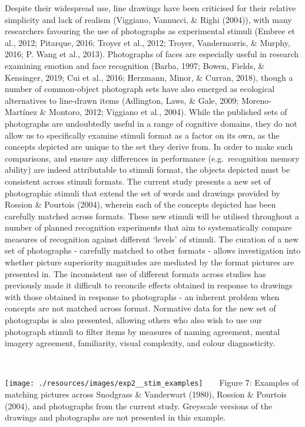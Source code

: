 \documentclass[
  11pt,
]{article}
\begin{document}
Despite their widespread use, line drawings have been criticised for
their relative simplicity and lack of realism (Viggiano, Vannucci, \&
Righi (2004)), with many researchers favouring the use of photographs as
experimental stimuli (Embree et al., 2012; Pitarque, 2016; Troyer et
al., 2012; Troyer, Vandermorris, \& Murphy, 2016; P. Wang et al., 2013).
Photographs of faces are especially useful in research examining emotion
and face recognition (Barba, 1997; Bowen, Fields, \& Kensinger, 2019;
Cui et al., 2016; Herzmann, Minor, \& Curran, 2018), though a number of
common-object photograph sets have also emerged as ecological
alternatives to line-drawn items (Adlington, Laws, \& Gale, 2009;
Moreno-Martínez \& Montoro, 2012; Viggiano et al., 2004). While the
published sets of photographs are undoubtedly useful in a range of
cognitive domains, they do not allow us to specifically examine stimuli
format as a factor on its own, as the concepts depicted are unique to
the set they derive from. In order to make such comparisons, and ensure
any differences in performance (e.g.~recognition memory ability) are
indeed attributable to stimuli format, the objects depicted must be
consistent across stimuli formats. The current study presents a new set
of photographic stimuli that extend the set of words and drawings
provided by Rossion \& Pourtois (2004), wherein each of the concepts
depicted has been carefully matched across formats. These new stimuli
will be utilised throughout a number of planned recognition experiments
that aim to systematically compare measures of recognition against
different `levels' of stimuli. The curation of a new set of photographs
- carefully matched to other formats - allows investigation into whether
picture superiority magnitudes are mediated by the format pictures are
presented in. The inconsistent use of different formats across studies
has previously made it difficult to reconcile effects obtained in
response to drawings with those obtained in response to photographs - an
inherent problem when concepts are not matched across format. Normative
data for the new set of photographs is also presented, allowing others
who also wish to use our photograph stimuli to filter items by measures
of naming agreement, mental imagery agreement, familiarity, visual
complexity, and colour diagnosticity.

~ ~

\texttt{[image: ./resources/images/exp2\_\_stim\_examples]}
~ ~ Figure 7: Examples of matching pictures across Snodgrass \&
Vanderwart (1980), Rossion \& Pourtois (2004), and photographs from the
current study. Greyscale versions of the drawings and photographs are
not presented in this example. ~ ~
\end{document}
